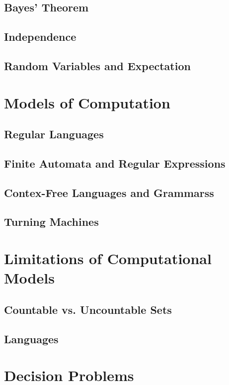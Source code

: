 \documentclass[a4paper]{article}
\begin{document}
\begin{multicols}{2}
	\subsection{Bayes' Theorem}
	\subsection{Independence}
	\subsection{Random Variables and Expectation}

	\section{Models of Computation}
	\subsection{Regular Languages}
	\subsection{Finite Automata and Regular Expressions}
	\subsection{Contex-Free Languages and Grammarss}
	\subsection{Turning Machines}

	\section{Limitations of Computational Models}
	\subsection{Countable vs. Uncountable Sets}
	\subsection{Languages}

	\section{Decision Problems}


\end{multicols}
\end{document}
